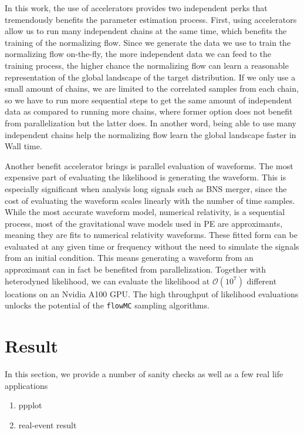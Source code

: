 \documentclass[twocolumn]{aastex631}
\begin{document}
In this work, the use of accelerators provides two independent perks that
tremendously benefits the parameter estimation process. First, using
accelerators allow us to run many independent chains at the same time, which
benefits the training of the normalizing flow. Since we generate the data we use
to train the normalizing flow on-the-fly, the more independent data we can feed
to the training process, the higher chance the normalizing flow can learn a
reasonable representation of the global landscape of the target distribution. If
we only use a small amount of chains, we are limited to the correlated samples
from each chain, so we have to run more sequential steps to get the same amount
of independent data as compared to running more chains, where former option does
not benefit from parallelization but the latter does. In another word, being
able to use many independent chains help the normalizing flow learn the global
landscape faster in Wall time.


Another benefit accelerator brings is parallel evaluation of waveforms. The most
expensive part of evaluating the likelihood is generating the waveform. This is
especially significant when analysis long signals such as BNS merger, since the
cost of evaluating the waveform scales linearly with the number of time samples.
While the most accurate waveform model, numerical relativity, is a sequential
process, most of the gravitational wave models used in PE are approximants,
meaning they are fits to numerical relativity waveforms. These fitted form can
be evaluated at any given time or frequency without the need to simulate the
signals from an initial condition. This means generating a waveform from an
approximant can in fact be benefited from parallelization. Together with
heterodyned likelihood, we can evaluate the likelihood at $\mathcal{O}(10^7)$
different locations on an Nvidia A100 GPU. The high throughput of likelihood
evaluations unlocks the potential of the \texttt{flowMC} sampling algorithms.

\section{Result}
\label{sec: Result}

In this section, we provide a number of sanity checks as well as a few real life applications

\begin{enumerate}
    \item ppplot
    \item real-event result
\end{enumerate}
\end{document}
